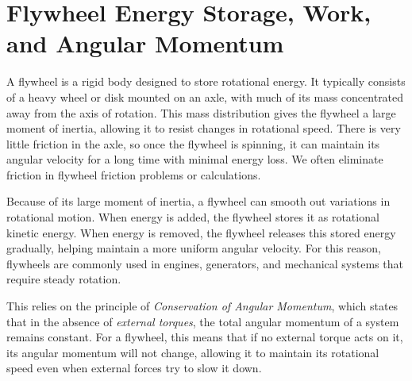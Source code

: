 \section{Flywheel Energy Storage, Work, and Angular Momentum}
A flywheel is a rigid body designed to store rotational energy. It typically consists of a heavy wheel or disk mounted on an axle, with much of its mass concentrated away from the axis of rotation. This mass distribution gives the flywheel a large moment of inertia, allowing it to resist changes in rotational speed. There is very little friction in the axle, so once the flywheel is spinning, it can maintain its angular velocity for a long time with minimal energy loss. We often eliminate friction in flywheel friction problems or calculations.

Because of its large moment of inertia, a flywheel can smooth out variations in rotational motion. When energy is added, the flywheel stores it as rotational kinetic energy. When energy is removed, the flywheel releases this stored energy gradually, helping maintain a more uniform angular velocity. For this reason, flywheels are commonly used in engines, generators, and mechanical systems that require steady rotation.

This relies on the principle of \emph{Conservation of Angular Momentum}, which states that in the absence of \emph{external torques}, the total angular momentum of a system remains constant. For a flywheel, this means that if no external torque acts on it, its angular momentum will not change, allowing it to maintain its rotational speed even when external forces try to slow it down.
